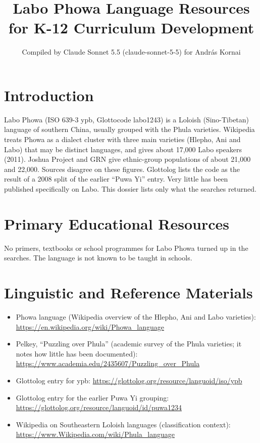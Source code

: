 \documentclass[12pt]{article}
\title{Labo Phowa Language Resources for K-12 Curriculum Development}
\author{Compiled by Claude Sonnet 5.5 (claude-sonnet-5-5) for Andr\'as Kornai}
\date{}
\begin{document}
\maketitle

\section{Introduction}
Labo Phowa (ISO 639-3 ypb, Glottocode labo1243) is a Loloish (Sino-Tibetan) language of southern China, usually grouped with the Phula varieties. Wikipedia treats Phowa as a dialect cluster with three main varieties (Hlepho, Ani and Labo) that may be distinct languages, and gives about 17,000 Labo speakers (2011). Joshua Project and GRN give ethnic-group populations of about 21,000 and 22,000. Sources disagree on these figures. Glottolog lists the code as the result of a 2008 split of the earlier ``Puwa Yi'' entry. Very little has been published specifically on Labo. This dossier lists only what the searches returned.

\section{Primary Educational Resources}
No primers, textbooks or school programmes for Labo Phowa turned up in the searches. The language is not known to be taught in schools.

\section{Linguistic and Reference Materials}
\begin{itemize}
\item Phowa language (Wikipedia overview of the Hlepho, Ani and Labo varieties): \url{https://en.wikipedia.org/wiki/Phowa_language}
\item Pelkey, ``Puzzling over Phula'' (academic survey of the Phula varieties; it notes how little has been documented): \url{https://www.academia.edu/2435607/Puzzling_over_Phula}
\item Glottolog entry for ypb: \url{https://glottolog.org/resource/languoid/iso/ypb}
\item Glottolog entry for the earlier Puwa Yi grouping: \url{https://glottolog.org/resource/languoid/id/puwa1234}
\item Wikipedia on Southeastern Loloish languages (classification context): \url{https://www.Wikipedia.com/wiki/Phula_language}
\end{itemize}
\end{document}
